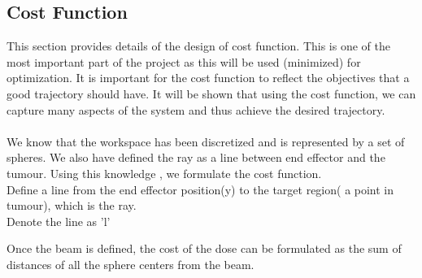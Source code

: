 \documentclass[10pt]{report}
\begin{document}
\subsection{Cost Function}
\label{cost_function}

This section provides details of the design of cost function. This is one of the most important part of the project as this will be used (minimized) for optimization. It is important for the cost function to reflect the objectives that a good trajectory should have. It will be shown that using the cost function, we can capture many aspects of the system and thus achieve the desired trajectory.
\\
\\
We know that the workspace has been discretized and is represented by a set of spheres. We also have defined the ray as a line between end effector and the tumour. Using this knowledge , we formulate the cost function.
\\
Define a line from the end effector position(y) to the target region( a point in tumour), which is the ray.
\\
Denote the line as 'l'

Once the beam is defined, the cost of the dose can be formulated as the sum of distances of all the sphere centers from the beam.
\end{document}

